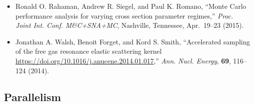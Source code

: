 \begin{itemize}
\item Ronald O. Rahaman, Andrew R. Siegel, and Paul K. Romano, ``Monte Carlo
performance analysis for varying cross section parameter regimes,''
\textit{Proc. Joint Int. Conf. M\&C+SNA+MC}, Nashville, Tennessee, Apr.\ 19--23 (2015).

\item Jonathan A. Walsh, Benoit Forget, and Kord S. Smith, ``Accelerated sampling of
the free gas resonance elastic scattering kernel
\url{https://doi.org/10.1016/j.anucene.2014.01.017},'' \textit{Ann. Nucl. Energy},
\textbf{69}, 116--124 (2014).

\end{itemize}

\subsection{Parallelism}

